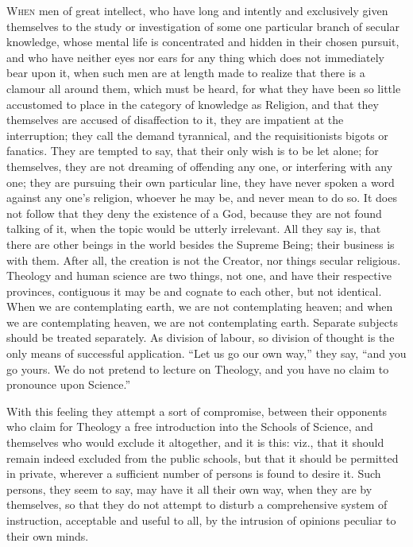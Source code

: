 W\textsc{hen} men of great intellect, who have long and intently and
exclusively given themselves to the study or investigation of some one
particular branch of secular knowledge, whose mental life is
concentrated and hidden in their chosen pursuit, and who have neither
eyes nor ears for any thing which does not immediately bear upon it,
when such men are at length made to realize that there is a clamour
all around them, which must be heard, for what they have been so
little accustomed to place in the category of knowledge as Religion,
and that they themselves are accused of disaffection to it, they are
impatient at the interruption; they call the demand tyrannical, and
the requisitionists bigots or fanatics. They are tempted to say, that
their only wish is to be let alone; for themselves, they are not
dreaming of offending any one, or interfering with any one; they are
pursuing their own particular line, they have never spoken a word
against any one's religion, whoever he may be, and never mean to do
so. It does not follow that they deny the existence of a God, because
they are not found talking of it, when the topic would be utterly
irrelevant. All they say is, that there are other beings in the
world besides the Supreme Being; their business is with them. After
all, the creation is not the Creator, nor things secular religious.
Theology and human science are two things, not one, and have their
respective provinces, contiguous it may be and cognate to each other,
but not identical. When we are contemplating earth, we are not
contemplating heaven; and when we are contemplating heaven, we are not
contemplating earth. Separate subjects should be treated separately.
As division of labour, so division of thought is the only means of
successful application. ``Let us go our own way,'' they say,
``and you go yours. We do not pretend to lecture on Theology, and
you have no claim to pronounce upon Science.''

With this feeling they attempt a sort of compromise, between their
opponents who claim for Theology a free introduction into the Schools
of Science, and themselves who would exclude it altogether, and it is
this: viz., that it should remain indeed excluded from the public
schools, but that it should be permitted in private, wherever a
sufficient number of persons is found to desire it. Such persons, they
seem to say, may have it all their own way, when they are by
themselves, so that they do not attempt to disturb a comprehensive
system of instruction, acceptable and useful to all, by the intrusion
of opinions peculiar to their own minds.

